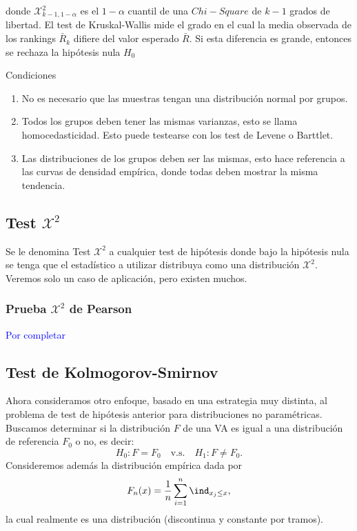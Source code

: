donde $\mathcal{X}^2_{k-1, 1-\alpha}$ es el $1-\alpha$ cuantil de una $Chi-Square$ de $k-1$ grados de libertad. El test de Kruskal-Wallis mide el grado en el cual la media observada de los rankings $\bar{R}_k$ difiere del valor esperado $\bar{R}$. Si esta diferencia es grande, entonces se rechaza la hipótesis nula $H_0$

Condiciones

\begin{enumerate}
    \item No es necesario que las muestras tengan una distribución normal por grupos.
    \item Todos los grupos deben tener las mismas varianzas, esto se llama homocedasticidad. Esto puede testearse con los test de Levene o Barttlet.
    \item Las distribuciones de los grupos deben ser las mismas, esto hace referencia a las curvas de densidad empírica, donde todas deben mostrar la misma tendencia. 
\end{enumerate}




\subsection{Test $\mathcal{X}^2$} 

Se le denomina Test $\mathcal{X}^2$  a cualquier test de hipótesis donde bajo la hipótesis nula se tenga que el estadístico a utilizar distribuya como una distribución $\mathcal{X}^2$. Veremos solo un caso de aplicación, pero existen muchos.

\subsubsection{Prueba $\mathcal{X}^2$ de Pearson}

\textcolor{blue}{Por completar}





\subsection{Test de Kolmogorov-Smirnov} 
\label{sub:test_KS}

Ahora consideramos otro enfoque, basado en una estrategia muy distinta, al problema de test de hipótesis anterior para distribuciones no paramétricas. Buscamos determinar si la distribución $F$ de una VA es igual a una distribución de referencia $F_0$ o no, es decir: 
	\begin{equation}
		H_0:F=F_0\quad \text{v.s.}\quad H_1:F\neq F_0.
	\end{equation}
Consideremos además la distribución empírica dada por 
\begin{equation}
	F_n(x) = \frac{1}{n}\sum_{i=1}^n\ind_{x_j\leq x}, 
\end{equation}
la cual realmente es una distribución (discontinua y  constante por tramos). 

